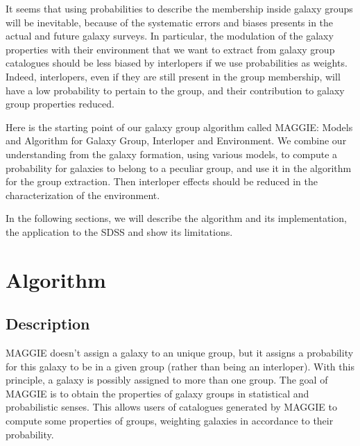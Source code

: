 It seems that using probabilities to describe the membership inside galaxy
groups will be inevitable, because of the systematic errors and biases presents
in the actual and future galaxy surveys. In particular, the modulation of the
galaxy properties with their environment that we want to extract from galaxy
group catalogues should be less biased by interlopers if we use probabilities
as weights. Indeed, interlopers, even if they are still present in the group
membership, will have a low probability to pertain to the group, and their
contribution to galaxy group properties reduced.

Here is the starting point of our galaxy group algorithm called MAGGIE\@:
Models and Algorithm for Galaxy Group, Interloper and Environment. We combine
our understanding from the galaxy formation, using various models, to compute a
probability for galaxies to belong to a peculiar group, and use it in the
algorithm for the group extraction. Then interloper effects should be reduced
in the characterization of the environment.

In the following sections, we will describe the algorithm and its
implementation, the application to the SDSS and show its limitations.

\section{Algorithm}
\label{sec:algorithm}

\subsection{Description}
\label{sub:maggie_description}

MAGGIE doesn't assign a galaxy to an unique group, but it assigns a probability
for this galaxy to be in a given group (rather than being an interloper). With
this principle, a galaxy is possibly assigned to more than one group. The goal
of MAGGIE is to obtain the properties of galaxy groups in statistical and
probabilistic senses. This allows users of catalogues generated by MAGGIE to
compute some properties of groups, weighting galaxies in accordance to their
probability.

